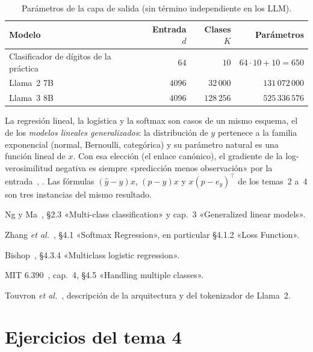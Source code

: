 \begin{table}[h]
\centering\small
\caption{Parámetros de la capa de salida (sin término independiente en los LLM).}\label{tab:cabezas}
\begin{tabular}{@{}lrrr@{}}
\toprule
Modelo & Entrada $d$ & Clases $K$ & Parámetros \\
\midrule
Clasificador de dígitos de la práctica & $64$ & $10$ & $64\cdot 10+10=650$ \\
Llama~2 7B~\cite{llama2} & $4096$ & $32\,000$ & $131\,072\,000$ \\
Llama~3 8B~\cite{llama3} & $4096$ & $128\,256$ & $525\,336\,576$ \\
\bottomrule
\end{tabular}
\end{table}

\begin{observacion}
La regresión lineal, la logística y la softmax son casos de un mismo esquema, el de los \emph{modelos lineales generalizados}: la distribución de $y$ pertenece a la familia exponencial (normal, Bernoulli, categórica) y su parámetro natural es una función lineal de $x$. Con esa elección (el enlace canónico), el gradiente de la log-verosimilitud negativa es siempre «predicción menos observación» por la entrada~\cite[cap.~3]{cs229}, \cite[§4.3.6]{bishop}. Las fórmulas $(\hat y-y)x$, $(p-y)x$ y $x(p-e_y)^{\top}$ de los temas~2 a~4 son tres instancias del mismo resultado.
\end{observacion}

\begin{lecturas}
\item Ng y Ma~\cite{cs229}, §2.3 «Multi-class classification» y cap.~3 «Generalized linear models».
\item Zhang \emph{et al.}~\cite{d2l}, §4.1 «Softmax Regression», en particular §4.1.2 «Loss Function».
\item Bishop~\cite{bishop}, §4.3.4 «Multiclass logistic regression».
\item MIT 6.390~\cite{mit6390}, cap.~4, §4.5 «Handling multiple classes».
\item Touvron \emph{et al.}~\cite{llama2}, descripción de la arquitectura y del tokenizador de Llama~2.
\end{lecturas}

\section*{Ejercicios del tema 4}

